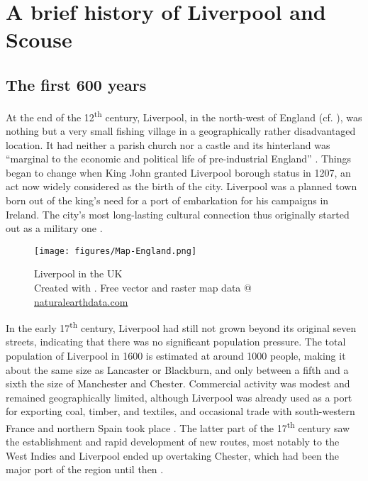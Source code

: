 \chapter{A brief history of Liverpool and Scouse}\label{ch.hist}



\section{The first 600 years}\label{sec.hist.early}
\largerpage
At the end of the 12\textsuperscript{th} century, Liverpool, in the north-west of England (cf. ), was nothing but a very small fishing village in a geographically rather disadvantaged location.
It had neither a parish church nor a castle and its hinterland was ``marginal to the economic and political life of pre-industrial England'' \citep[59]{kermodeetal2006}.
Things began to change when King John granted Liverpool borough status in 1207, an act now widely considered as the birth of the city. Liverpool was a planned town born out of the king's need for a port of embarkation for his campaigns in Ireland.
The city's most long-lasting cultural connection thus originally started out as a military one \parencite[cf.][59--63]{kermodeetal2006}. 

\begin{figure}[h] 
 		\texttt{[image: figures/Map-England.png]}
		\caption{Liverpool in the UK\\ \tiny Created with \cite{QGIS2016}. Free vector and raster map data @ \url{naturalearthdata.com}}
		\label{fig.ex}
\end{figure}
\clearpage 


In the early 17\textsuperscript{th} century, Liverpool had still not grown beyond its original seven streets, indicating that there was no significant population pressure.
The total population of Liverpool in 1600 is estimated at around 1000 people, making it about the same size as Lancaster or Blackburn, and only between a fifth and a sixth the size of Manchester and Chester.
Commercial activity was modest and remained geographically limited, although Liverpool was already used as a port for exporting  coal, timber, and textiles, and occasional trade with south-western France and northern Spain took place \parencite[cf.][72--76 and 81--84]{kermodeetal2006}.
The latter part of the 17\textsuperscript{th} century saw the establishment and rapid development of new routes, most notably to the West Indies and Liverpool ended up overtaking Chester, which had been the major port of the region until then \citep[cf.][107--110]{kermodeetal2006}.

